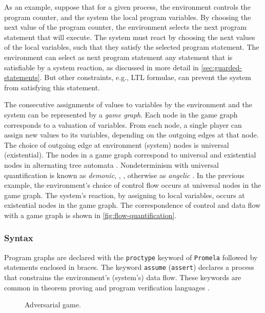 \documentclass[copyright]{eptcs}
\begin{document}
As an example, suppose that for a given process, the environment controls the program counter, and the system the local program variables.
By choosing the next value of the program counter, the environment selects the next program statement that will execute.
The system must react by choosing the next values of the local variables, such that they satisfy the selected program statement.
The environment can select as next program statement any statement that is satisfiable by a system reaction, as discussed in more detail in \cref{sec:guarded-statements}.
But other constraints, e.g., LTL formulae, can prevent the system from satisfying this statement.

The consecutive assignments of values to variables by the environment and the system can be represented by a {\em game graph}.
Each node in the game graph corresponds to a valuation of variables.
From each node, a single player can assign new values to its variables, depending on the outgoing edges at that node.
The choice of outgoing edge at environment (system) nodes is universal (existential).
The nodes in a game graph correspond to universal and existential nodes in alternating tree automata \cite{Chandra81jacm,Muller86alp,Vardi95cst,Vardi96lc,Kupferman05focs}.
Nondeterminism with universal quantification is known as {\em demonic}, \cite[p.85]{Hoare85csp}, \cite{Sondergaard1992cj}, otherwise as {\em angelic} \cite{McCarthy63,Floyd67jacm,Broy86tcs}.
In the previous example, the environment's choice of control flow occurs at universal nodes in the game graph.
The system's reaction, by assigning to local variables, occurs at existential nodes in the game graph.
The correspondence of control and data flow with a game graph is shown in \cref{fig:flow-quantification}.


\subsubsection{Syntax}

Program graphs are declared with the \texttt{proctype} keyword of \texttt{Promela} followed by statements enclosed in braces.
The keyword \texttt{assume} (\texttt{assert}) declares a process that constrains the environment's (system's) data flow.
These keywords are common in theorem proving and program verification languages \cite{Leino10lpair}.

\begin{wrapfigure}{r}{6cm}
\centering
{}
\caption{Adversarial game.}
\label{fig:board_game}
\end{wrapfigure}
\end{document}
